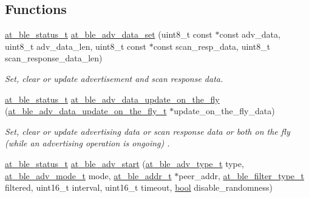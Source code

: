 \subsection*{Functions}
\begin{DoxyCompactItemize}
\item 
\mbox{\hyperlink{group__error__codes__group_ga3b1db9b95feb157b3c188ca27fe76988}{at\+\_\+ble\+\_\+status\+\_\+t}} \mbox{\hyperlink{group__gap__adv__group_gaf4472b661944026a537f3fe2f65b8fcc}{at\+\_\+ble\+\_\+adv\+\_\+data\+\_\+set}} (uint8\+\_\+t const $\ast$const adv\+\_\+data, uint8\+\_\+t adv\+\_\+data\+\_\+len, uint8\+\_\+t const $\ast$const scan\+\_\+resp\+\_\+data, uint8\+\_\+t scan\+\_\+response\+\_\+data\+\_\+len)
\begin{DoxyCompactList}\small\item\em Set, clear or update advertisement and scan response data. \end{DoxyCompactList}\item 
\mbox{\hyperlink{group__error__codes__group_ga3b1db9b95feb157b3c188ca27fe76988}{at\+\_\+ble\+\_\+status\+\_\+t}} \mbox{\hyperlink{group__gap__adv__group_ga6dbd9fb49cc0fb4feecd09c87ba29518}{at\+\_\+ble\+\_\+adv\+\_\+data\+\_\+update\+\_\+on\+\_\+the\+\_\+fly}} (\mbox{\hyperlink{structat__ble__adv__data__update__on__the__fly__t}{at\+\_\+ble\+\_\+adv\+\_\+data\+\_\+update\+\_\+on\+\_\+the\+\_\+fly\+\_\+t}} $\ast$update\+\_\+on\+\_\+the\+\_\+fly\+\_\+data)
\begin{DoxyCompactList}\small\item\em Set, clear or update advertising data or scan response data or both on the fly (while an advertising operation is ongoing) . \end{DoxyCompactList}\item 
\mbox{\hyperlink{group__error__codes__group_ga3b1db9b95feb157b3c188ca27fe76988}{at\+\_\+ble\+\_\+status\+\_\+t}} \mbox{\hyperlink{group__gap__adv__group_ga1a780803d17a447dee42b1afdae1e165}{at\+\_\+ble\+\_\+adv\+\_\+start}} (\mbox{\hyperlink{at__ble__api_8h_a6c5e17c16e2d49e866f2f1effd646741}{at\+\_\+ble\+\_\+adv\+\_\+type\+\_\+t}} type, \mbox{\hyperlink{at__ble__api_8h_a111d43782f9cab2913633e89a8fa7d42}{at\+\_\+ble\+\_\+adv\+\_\+mode\+\_\+t}} mode, \mbox{\hyperlink{structat__ble__addr__t}{at\+\_\+ble\+\_\+addr\+\_\+t}} $\ast$peer\+\_\+addr, \mbox{\hyperlink{at__ble__api_8h_ac1f9457ee534feed87551fc93f9d83d3}{at\+\_\+ble\+\_\+filter\+\_\+type\+\_\+t}} filtered, uint16\+\_\+t interval, uint16\+\_\+t timeout, \mbox{\hyperlink{group__group__sam0__utils_ga97a80ca1602ebf2303258971a2c938e2}{bool}} disable\+\_\+randomness)

\end{DoxyCompactItemize}
